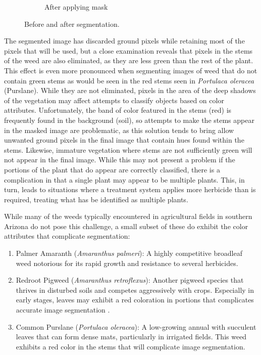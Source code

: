 \documentclass[letterpaper, notitlepage]{report}
\begin{document}
{\begin{figure}[H]
\begin{subfigure}[h]{.32\textwidth}
	  \caption{After applying mask}
	  \label{fig:original-masked}
	\end{subfigure}
	\caption[Before and after segmentation]{Before and after segmentation.}
	\label{fig:segmentation}
\end{figure}
The segmented image has discarded ground pixels while retaining most of the pixels that will be used, but a close examination reveals that pixels in the stems of the weed are also eliminated, as they are less green than the rest of the plant. This effect is even more pronounced when segmenting images of weed that do not contain green stems as would be seen in the red stems seen in \textit{Portulaca oleracea} (Purslane). While they are not eliminated, pixels in the area of the deep shadows of the vegetation may affect attempts to classify objects based on color attributes. Unfortunately, the band of color featured in the stems (red) is frequently found in the background (soil), so attempts to make the stems appear in the masked image are problematic, as this solution tends to bring allow unwanted ground pixels in the final image that contain hues found within the stems. Likewise, immature vegetation where stems are not sufficiently green will not appear in the final image.  While this may not present a problem if the portions of the plant that do appear are correctly classified, there is a complication in that a single plant may appear to be multiple plants. This, in turn, leads to situations where a treatment system applies more herbicide than is required, treating what has be identified as multiple plants.

While many of the weeds typically encountered in agricultural fields in southern Arizona do not pose this challenge,  a small subset of these do exhibit the color attributes that complicate segmentation:
\begin{enumerate}
	\item{Palmer Amaranth (\textit{Amaranthus palmeri}): A highly competitive broadleaf weed notorious for its rapid growth and resistance to several herbicides.}

	\item{Redroot Pigweed (\textit{Amaranthus retroflexus}): Another pigweed species that thrives in disturbed soils and competes aggressively with crops. Especially in early stages, leaves may exhibit a red coloration in portions that complicates accurate image segmentation \parencite{Sosnoskie2018-ye}.}

	\item{Common Purslane (\textit{Portulaca oleracea}): A low-growing annual with succulent leaves that can form dense mats, particularly in irrigated fields. This weed exhibits a red color in the stems that will complicate image segmentation.}


\end{enumerate}}
\end{document}
